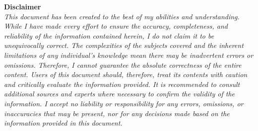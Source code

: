 \begin{titlepage}
\vfill
\textbf{Disclaimer}\\[0.5cm]
\textit{This document has been created to the best of my abilities and understanding. While I have made every effort to ensure the accuracy, completeness, and reliability of the information contained herein, I do not claim it to be unequivocally correct. The complexities of the subjects covered and the inherent limitations of any individual's knowledge mean there may be inadvertent errors or omissions. Therefore, I cannot guarantee the absolute correctness of the entire content.
Users of this document should, therefore, treat its contents with caution and critically evaluate the information provided. It is recommended to consult additional sources and experts where necessary to confirm the validity of the information. I accept no liability or responsibility for any errors, omissions, or inaccuracies that may be present, nor for any decisions made based on the information provided in this document.}

\vspace{2\baselineskip}

\end{titlepage}
